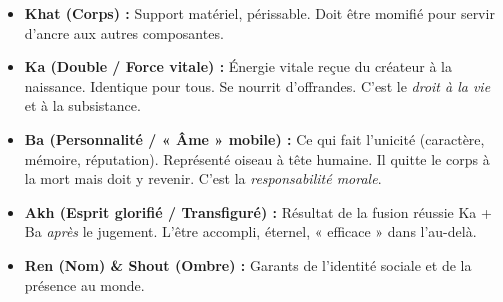 \documentclass[11pt]{article}
\newcommand{\cle}[1]{{\popxbold\color{popdark}#1}}
\begin{document}
\begin{definition}
\begin{itemize}
    \item \textbf{\cle{Khat} (Corps) :} Support matériel, périssable. Doit être momifié pour servir d'ancre aux autres composantes.
    \item \textbf{\cle{Ka} (Double / Force vitale) :} Énergie vitale reçue du créateur à la naissance. Identique pour tous. Se nourrit d'offrandes. C'est le \emph{droit à la vie} et à la subsistance.
    \item \textbf{\cle{Ba} (Personnalité / « Âme » mobile) :} Ce qui fait l'unicité (caractère, mémoire, réputation). Représenté oiseau à tête humaine. Il quitte le corps à la mort mais doit y revenir. C'est la \emph{responsabilité morale}.
    \item \textbf{\cle{Akh} (Esprit glorifié / Transfiguré) :} Résultat de la fusion réussie Ka + Ba \emph{après} le jugement. L'être accompli, éternel, « efficace » dans l'au-delà.
    \item \textbf{\cle{Ren} (Nom) \& \cle{Shout} (Ombre) :} Garants de l'identité sociale et de la présence au monde.
\end{itemize}
\end{definition}
\end{document}
